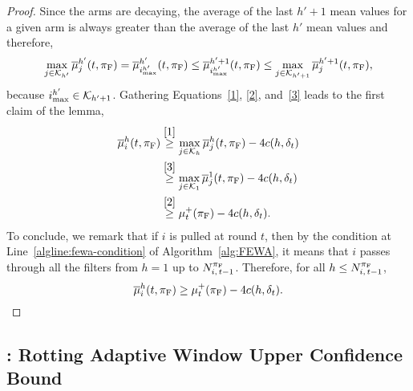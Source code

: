\begin{proof}
Since the arms are decaying, the average of the last $h' +1$ mean values for a given arm is always greater than the average of the last $h'$ mean values
and therefore, 
\begin{equation}
\label{3}
 \max_{j \in \mathcal{K}_{h'}}\overline{\mu}_j^{h'}(t,\pi_{\rm F}) =   \overline{\mu}_{i^{h'}_{\max}}^{h'}(t,\pi_{\rm F}) \leq \overline{\mu}_{i^{h'}_{\max}}^{h'+1}(t,\pi_{\rm F}) \leq \max_{j \in \mathcal{K}_{h'+1}}\overline{\mu}^{h' +1 }_{j}(t,\pi_{\rm F}), 
\end{equation}
because $i^{h'}_{\rm max} \in \mathcal{K}_{h'+1}$. Gathering Equations~\ref{1}, \ref{2}, and~\ref{3} leads to the first claim of the lemma,
\begin{align*}
\overline{\mu}^{h}_i(t,\pi_{\rm F})
&\stackrel{\eqref{1}}{\geq} \max_{j \in \mathcal{K}_h}\overline{\mu}^{h}_{j}(t,\pi_{\rm F}) - 4c(h, \delta_t)\\
&\stackrel{\eqref{3}}{\geq} \max_{j \in \mathcal{K}_1}\overline{\mu}^{1}_{j}(t,\pi_{\rm F})- 4c(h,  \delta_t)\\
&\stackrel{\eqref{2}}{\geq}  \mu^+_t(\pi_{\rm F}) - 4c(h, \delta_t).
\end{align*}
To conclude, we remark that if $i$ is pulled at round $t$, then by the condition at Line~\ref{algline:fewa-condition} of Algorithm~\ref{alg:FEWA}, it means that $i$ passes through all the filters from $h=1$ up to $N_{i,\,t-1}^{\pi_{\rm F}}$. Therefore, for all $h\leq N_{i,\,t-1}^{\pi_{\rm F}}$,
%
\begin{equation}
\overline{\mu}^{h}_i(t,\pi_{\rm F}) \geq  \mu^+_t(\pi_{\rm F}) - 4 c(h, \delta_t).
\end{equation}
\end{proof}





\subsection{{\RUCB} : Rotting Adaptive Window Upper Confidence Bound}
\label{sec:algo}

